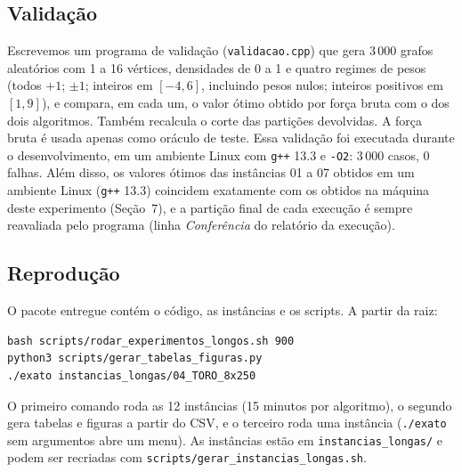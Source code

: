 \subsection{Validação}

Escrevemos um programa de validação (\texttt{validacao.cpp}) que gera 3\,000 grafos aleatórios com 1 a 16 vértices, densidades de 0 a 1 e quatro regimes de pesos (todos $+1$; $\pm1$; inteiros em $[-4,6]$, incluindo pesos nulos; inteiros positivos em $[1,9]$), e compara, em cada um, o valor ótimo obtido por força bruta com o dos dois algoritmos. Também recalcula o corte das partições devolvidas. A força bruta é usada apenas como oráculo de teste. Essa validação foi executada durante o desenvolvimento, em um ambiente Linux com \texttt{g++} 13.3 e \texttt{-O2}: 3\,000 casos, 0 falhas. Além disso, os valores ótimos das instâncias 01 a 07 obtidos em um ambiente Linux (\texttt{g++} 13.3) coincidem exatamente com os obtidos na máquina deste experimento (Seção~7), e a partição final de cada execução é sempre reavaliada pelo programa (linha \emph{Conferência} do relatório da execução).

\subsection{Reprodução}

O pacote entregue contém o código, as instâncias e os scripts. A partir da raiz:
\begin{verbatim}
bash scripts/rodar_experimentos_longos.sh 900
python3 scripts/gerar_tabelas_figuras.py
./exato instancias_longas/04_TORO_8x250
\end{verbatim}
O primeiro comando roda as 12 instâncias (15 minutos por algoritmo), o segundo gera tabelas e figuras a partir do CSV, e o terceiro roda uma instância (\texttt{./exato} sem argumentos abre um menu).
As instâncias estão em \texttt{instancias\_longas/} e podem ser recriadas com \texttt{scripts/gerar\_instancias\_longas.sh}.
